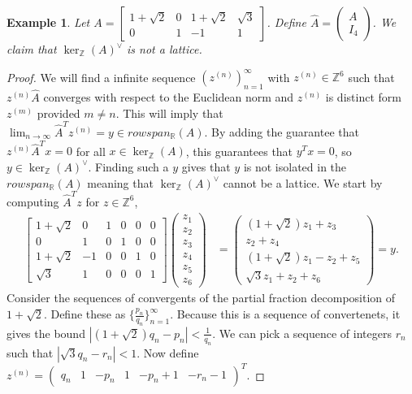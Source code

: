 \documentclass{article}
\newcommand{\Z}[0]{\mathbb{Z}}		%
\newcommand{\R}[0]{\mathbb{R}}		%
\newtheorem{ex}[thm]{Example}
\theoremstyle{definition}
\theoremstyle{remark}
\begin{document}
\begin{ex}
Let $A = \begin{bmatrix}1+\sqrt{2} & 0 & 1+\sqrt{2} & \sqrt{3} \\ 0 & 1 & -1 &1\end{bmatrix}$. Define $\hat A = \begin{pmatrix}
A \\ I_4
 \end{pmatrix}$. We claim that $ \ker_\Z(A)^\vee$ is not a lattice. %
\end{ex}
\begin{proof}

We will find a infinite sequence $(z^{(n)})_{n=1}^\infty$ with $z^{(n)}\in \Z^6$ such that $z^{(n)}\hat A$ converges with respect to the Euclidean norm and $z^{(n)}$ is distinct form $z^{(m)}$ provided $m\neq n$. This will imply that $\lim_{n\to \infty} \hat A^T z^{(n)} = y \in rowspan_\R(A)$. By adding the guarantee that $z^{(n)}\hat A^Tx =0$ for all $x\in \ker_\Z(A)$, this guarantees that $y^Tx=0$, so $y\in \ker_\Z(A)^\vee$. Finding such a $y$ gives that $y$ is not isolated in the $rowspan_\R(A)$ meaning that $ \ker_\Z(A)^\vee$ cannot be a lattice.  
We start by computing $\hat A^Tz$ for $z\in \Z^6$,
\begin{align}
    \begin{bmatrix}
    1+\sqrt{2} &0 & 1& 0 &0&0 \\ 
    0 &1 & 0& 1 &0&0 \\
    1+\sqrt{2} &-1 & 0& 0 &1&0 \\
    \sqrt{3} &1 & 0& 0 &0&1 
    \end{bmatrix}\begin{pmatrix}
    z_1\\z_2\\z_3\\z_4\\z_5\\z_6
    \end{pmatrix}&= \begin{pmatrix}
    (1+\sqrt{2})z_1 +z_3 \\ 
    z_2 +z_4\\
     (1+\sqrt{2})z_1 -z_2+z_5 \\
          \sqrt{3}z_1 +z_2+z_6
    \end{pmatrix}=y.
\end{align}
Consider the sequences of convergents of the partial fraction decomposition of $1+\sqrt{2}$. Define these as $\{\frac{p_n}{q_n}\}_{n=1}^\infty$. Because this is a sequence of convertenets, it gives the bound $|(1+\sqrt{2})q_n - p_n|< \frac{1}{q_n}$. 
We can pick a sequence of integers $r_n$ such that $|\sqrt{3}q_n -r_n|<1$. Now  define $z^{(n)} = \begin{pmatrix}
q_n & 1& -p_n & 1 & -p_n+1 & -r_n-1 
\end{pmatrix}^T.$ 



\end{proof}
\end{document}
